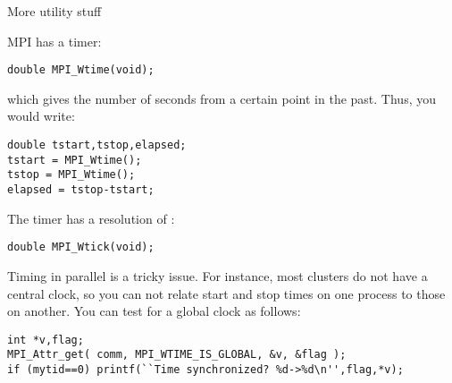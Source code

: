  {More utility stuff}

MPI has a  timer: 
\begin{verbatim}
double MPI_Wtime(void);
\end{verbatim}
which gives the number of seconds from a certain point in the past.
Thus, you would write:
\begin{verbatim}
double tstart,tstop,elapsed;
tstart = MPI_Wtime();
tstop = MPI_Wtime();
elapsed = tstop-tstart;
\end{verbatim}
The timer has a resolution of :
\begin{verbatim}
double MPI_Wtick(void);
\end{verbatim}
Timing in parallel is a tricky issue. For instance, most clusters do
not have a central clock, so you can not relate start and stop times
on one process to those on another. You can test for a global clock as
follows:
\begin{verbatim}
int *v,flag;
MPI_Attr_get( comm, MPI_WTIME_IS_GLOBAL, &v, &flag );
if (mytid==0) printf(``Time synchronized? %d->%d\n'',flag,*v);
\end{verbatim}
